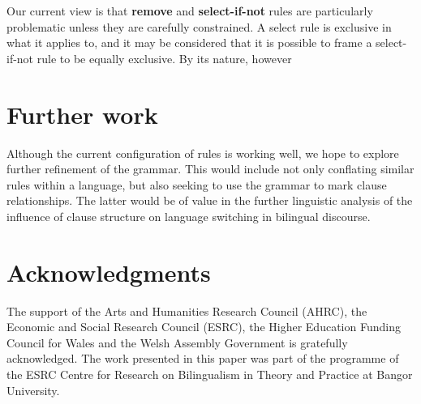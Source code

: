 \documentclass[11pt]{article}
\begin{document}
Our current view is that \textbf{remove} and \textbf{select-if-not} rules are particularly problematic unless they are carefully constrained.  A select rule is exclusive in what it applies to, and it may be considered that it is possible to frame a select-if-not rule to be equally exclusive.  By its nature, however


\section{Further work}
\label{sec:further}


Although the current configuration of rules is working well, we hope to explore further refinement of the grammar.  This would include not only conflating similar rules within a language, but also seeking to use the grammar to mark clause relationships.  The latter would be of value in the further linguistic analysis of the influence of clause structure on language switching in bilingual discourse.


\section*{Acknowledgments}

The support of the Arts and Humanities Research Council (AHRC), the Economic and Social Research Council (ESRC), the Higher Education Funding Council for Wales and the Welsh Assembly Government is gratefully acknowledged. The work presented in this paper was part of the programme of the ESRC Centre for Research on Bilingualism in Theory and Practice at Bangor University.




\end{document}
